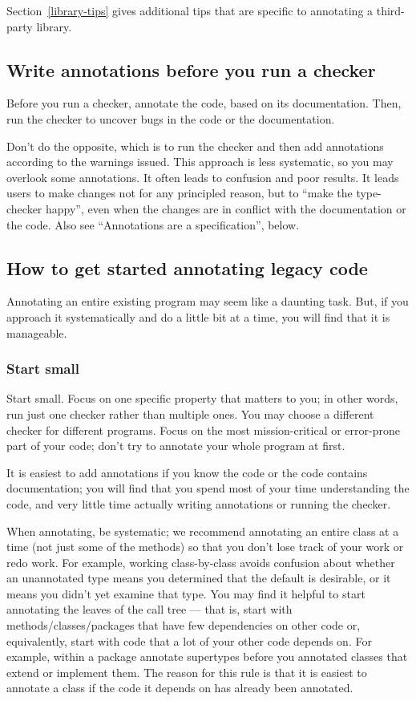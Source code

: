 Section~\ref{library-tips} gives additional tips that are
specific to annotating a third-party library.


\subsection{Write annotations before you run a checker\label{annotate-before-checking}}

Before you run a checker, annotate the code, based on its documentation.
Then, run the checker to uncover bugs in the code or the documentation.

Don't do the opposite, which is to run the checker and then add annotations
according to the warnings issued.  This approach is less systematic, so you
may overlook some annotations.  It often leads to confusion and poor
results.  It leads users to make changes not for any principled reason, but
to ``make the type-checker happy'', even when the changes are in conflict
with the documentation or the code.  Also see ``Annotations
are a specification'', below.


\subsection{How to get started annotating legacy code\label{get-started-with-legacy-code}}

Annotating an entire existing program may seem like a daunting task.  But,
if you approach it systematically and do a little bit at a time, you will
find that it is manageable.

\subsubsection{Start small\label{get-started-start-small}}

Start small.  Focus on one specific property that matters to you; in
other words, run just one checker rather than multiple ones.  You may
choose a different checker for different programs.
Focus on
the most mission-critical or error-prone part of your code; don't try to
annotate your whole program at first.

It is easiest to add annotations if you know the code or the
code contains documentation; you will find that you spend most of your time
understanding the code, and very little time actually writing annotations
or running the checker.

When annotating, be systematic; we recommend
annotating an entire class at a time (not just some of the methods)
so that you don't lose track of your work or redo work.  For example,
working class-by-class avoids confusion about whether an unannotated type
means you determined that the default is desirable, or it means you didn't
yet examine that type.
You may find it helpful to start annotating the leaves of the call tree ---
that is,
start with methods/classes/packages that have few dependencies on other
code or, equivalently, start with code that a lot of your other code
depends on.  For example, within a package annotate supertypes before you
annotated classes that extend or implement them.
The reason for this rule is that it is
easiest to annotate a class if the code it depends on has already been
annotated.

